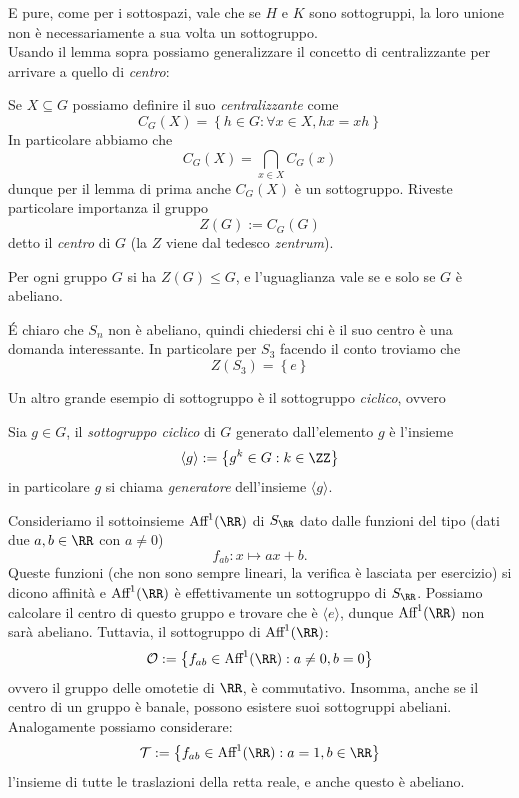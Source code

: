 \documentclass[11pt]{scrartcl}
\begin{document}
	E pure, come per i sottospazi, vale che se $H$ e $K$ sono sottogruppi, la loro unione non è necessariamente a sua volta un sottogruppo. \\
	Usando il lemma sopra possiamo generalizzare il concetto di centralizzante per arrivare a quello di \textit{centro}:
	\begin{definition}[Centro]
		Se $X\subseteq G$ possiamo definire il suo \textit{centralizzante} come
		$$C_G(X)=\left\{h\in G: \forall x\in X, hx=xh\right\}$$
		In particolare abbiamo che
		$$C_G(X)=\bigcap_{x\in X}C_G(x)$$
		dunque per il lemma di prima anche $C_G(X)$ è un sottogruppo. Riveste particolare importanza il gruppo 
		$$Z(G):=C_G(G)$$
		detto il \textit{centro} di $G$ (la $Z$ viene dal tedesco \textit{zentrum}). 
	\end{definition}
	\begin{corollary}
		Per ogni gruppo $G$ si ha $Z(G)\le G$, e l'uguaglianza vale se e solo se $G$ è abeliano. 
	\end{corollary}
	\begin{example}[Centro di $S_3$]
		\'E chiaro che $S_n$ non è abeliano, quindi chiedersi chi è il suo centro è una domanda interessante. In particolare per $S_3$ facendo il conto troviamo che
		$$Z(S_3)=\left\{e\right\}$$
	\end{example}
	Un altro grande esempio di sottogruppo è il sottogruppo \textit{ciclico}, ovvero
	\begin{definition}
		Sia $g\in G$, il \textit{sottogruppo ciclico} di $G$ generato dall'elemento $g$ è l'insieme
		$$\langle g \rangle:=\left\{g^k\in G:k\in\ZZ\right\}$$
		in particolare $g$ si chiama \textit{generatore} dell'insieme $\langle g \rangle$. 
	\end{definition}
	\begin{example}
		Consideriamo il sottoinsieme $\text{Aff}^1(\RR)$ di $S_\RR$ dato dalle funzioni del tipo (dati due $a,b\in\RR$ con $a\ne 0$)
		$$f_{ab}:x\mapsto ax+b.$$
		Queste funzioni (che non sono sempre lineari, la verifica è lasciata per esercizio) si dicono affinità e $\text{Aff}^1(\RR)$ è effettivamente un sottogruppo di $S_\RR$. Possiamo calcolare il centro di questo gruppo e trovare che è $\langle e \rangle$, dunque $\text{Aff}^1(\RR)$ non sarà abeliano.
		Tuttavia, il sottogruppo di $\text{Aff}^1(\RR)$:
		 $$\mathcal{O}:=\left\{f_{ab}\in \text{Aff}^1(\RR):a\ne 0, b=0\right\}$$
		 ovvero il gruppo delle omotetie di $\RR$, è commutativo. Insomma, anche se il centro di un gruppo è banale, possono esistere suoi sottogruppi abeliani. Analogamente possiamo considerare:
		 $$\mathcal{T}:=\left\{f_{ab}\in \text{Aff}^1(\RR):a=1,b\in\RR\right\}$$
		 l'insieme di tutte le traslazioni della retta reale, e anche questo è abeliano.
	\end{example}
\end{document}
